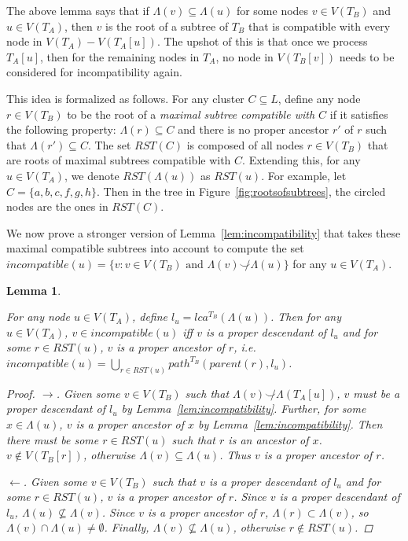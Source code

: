 \documentclass{article}
\newcommand{\compatible}{\smile}
\newcommand{\leafset}{\Lambda}
\newtheorem{incompatibilityrootsofsubtrees}[incompatibility]{Lemma}
\begin{document}
    The above lemma says that if $\leafset(v) \subseteq \leafset(u)$ for some nodes $v \in V(T_B)$ and $u \in V(T_A)$, then $v$ is the root of a subtree of $T_B$ that is compatible with every node in $V(T_A) - V(T_A[u])$. The upshot of this is that once we process $T_A[u]$, then for the remaining nodes in $T_A$, no node in $V(T_B[v])$ needs to be considered for incompatibility again.

    This idea is formalized as follows. For any cluster $C \subseteq L$, define any node $r \in V(T_B)$ to be the root of a \textit{maximal subtree compatible with $C$} if it satisfies the following property: $\leafset(r) \subseteq C$ and there is no proper ancestor $r'$ of $r$ such that $\leafset(r') \subseteq C$. The set $RST(C)$ is composed of all nodes $r \in V(T_B)$ that are roots of maximal subtrees compatible with $C$. Extending this, for any $u \in V(T_A)$, we denote $RST(\leafset(u))$ as $RST(u)$. For example, let $C = \{a, b, c, f, g, h\}$. Then in the tree in Figure~\ref{fig:rootsofsubtrees}, the circled nodes are the ones in $RST(C)$.

    We now prove a stronger version of Lemma~\ref{lem:incompatibility} that takes these maximal compatible subtrees into account to compute the set $incompatible(u) = \{v : v \in V(T_B) \text{ and } \leafset(v) \not\compatible \leafset(u)\}$ for any $u \in V(T_A)$.
    \newline

    \begin{incompatibilityrootsofsubtrees}
        \label{lem:incompatibilityrootsofsubtrees}

        For any node $u \in V(T_A)$, define $l_u = lca^{T_B}(\leafset(u))$. Then for any $u \in V(T_A)$, $v \in incompatible(u)$ iff $v$ is a proper descendant of $l_u$ and for some $r \in RST(u)$, $v$ is a proper ancestor of $r$, i.e. $incompatible(u) = \bigcup_{r \in RST(u)} path^{T_B}(parent(r), l_u)$.

        \begin{proof}
            $\longrightarrow$. Given some $v \in V(T_B)$ such that $\leafset(v) \not\compatible \leafset(T_A[u])$, $v$ must be a proper descendant of $l_u$ by Lemma~\ref{lem:incompatibility}. Further, for some $x \in \leafset(u)$, $v$ is a proper ancestor of $x$ by Lemma~\ref{lem:incompatibility}. Then there must be some $r \in RST(u)$ such that $r$ is an ancestor of $x$. $v \not\in V(T_B[r])$, otherwise $\leafset(v) \subseteq \leafset(u)$. Thus $v$ is a proper ancestor of $r$.

            $\longleftarrow$. Given some $v \in V(T_B)$ such that $v$ is a proper descendant of $l_u$ and for some $r \in RST(u)$, $v$ is a proper ancestor of $r$. Since $v$ is a proper descendant of $l_u$, $\leafset(u) \not\subseteq \leafset(v)$. Since $v$ is a proper ancestor of $r$, $\leafset(r) \subset \leafset(v)$, so $\leafset(v) \cap \leafset(u) \neq \emptyset$. Finally, $\leafset(v) \not\subseteq \leafset(u)$, otherwise $r \not\in RST(u)$.
        \end{proof}
    \end{incompatibilityrootsofsubtrees}
\end{document}
